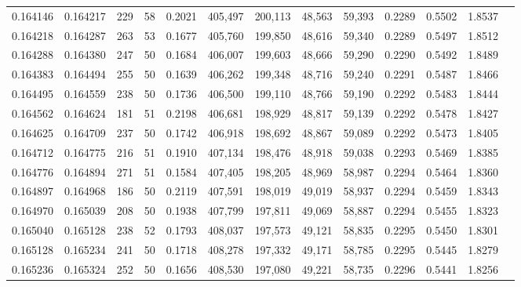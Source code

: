 \begin{tabular}{rrrrrrrrrrrrr}
0.164146 & 0.164217 &   229 &  58 &                                     0.2021 & 405,497 & 200,113 &  48,563 &  59,393 & 0.2289 & 0.5502 & 1.8537 \\
0.164218 & 0.164287 &   263 &  53 &                                     0.1677 & 405,760 & 199,850 &  48,616 &  59,340 & 0.2289 & 0.5497 & 1.8512 \\
0.164288 & 0.164380 &   247 &  50 &                                     0.1684 & 406,007 & 199,603 &  48,666 &  59,290 & 0.2290 & 0.5492 & 1.8489 \\
0.164383 & 0.164494 &   255 &  50 &                                     0.1639 & 406,262 & 199,348 &  48,716 &  59,240 & 0.2291 & 0.5487 & 1.8466 \\
0.164495 & 0.164559 &   238 &  50 &                                     0.1736 & 406,500 & 199,110 &  48,766 &  59,190 & 0.2292 & 0.5483 & 1.8444 \\
0.164562 & 0.164624 &   181 &  51 &                                     0.2198 & 406,681 & 198,929 &  48,817 &  59,139 & 0.2292 & 0.5478 & 1.8427 \\
0.164625 & 0.164709 &   237 &  50 &                                     0.1742 & 406,918 & 198,692 &  48,867 &  59,089 & 0.2292 & 0.5473 & 1.8405 \\
0.164712 & 0.164775 &   216 &  51 &                                     0.1910 & 407,134 & 198,476 &  48,918 &  59,038 & 0.2293 & 0.5469 & 1.8385 \\
0.164776 & 0.164894 &   271 &  51 &                                     0.1584 & 407,405 & 198,205 &  48,969 &  58,987 & 0.2294 & 0.5464 & 1.8360 \\
0.164897 & 0.164968 &   186 &  50 &                                     0.2119 & 407,591 & 198,019 &  49,019 &  58,937 & 0.2294 & 0.5459 & 1.8343 \\
0.164970 & 0.165039 &   208 &  50 &                                     0.1938 & 407,799 & 197,811 &  49,069 &  58,887 & 0.2294 & 0.5455 & 1.8323 \\
0.165040 & 0.165128 &   238 &  52 &                                     0.1793 & 408,037 & 197,573 &  49,121 &  58,835 & 0.2295 & 0.5450 & 1.8301 \\
0.165128 & 0.165234 &   241 &  50 &                                     0.1718 & 408,278 & 197,332 &  49,171 &  58,785 & 0.2295 & 0.5445 & 1.8279 \\
0.165236 & 0.165324 &   252 &  50 &                                     0.1656 & 408,530 & 197,080 &  49,221 &  58,735 & 0.2296 & 0.5441 & 1.8256 \\

\end{tabular}
